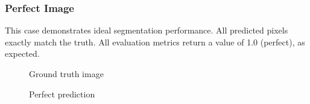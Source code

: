 \documentclass[openany, 12pt]{article}
\begin{document}
\subsubsection*{Perfect Image}
This case demonstrates ideal segmentation performance. All predicted pixels exactly match the truth. All evaluation metrics return a value of 1.0 (perfect), as expected.
\begin{figure}[htbp]
	\centering
	\begin{minipage}{0.47\textwidth}
		\centering
		\caption{Ground truth image}
	\end{minipage}
	\hspace{0.01\textwidth}
	\begin{minipage}{0.47\textwidth}
		\centering
		\caption{Perfect prediction}
	\end{minipage}
\end{figure}
\end{document}
